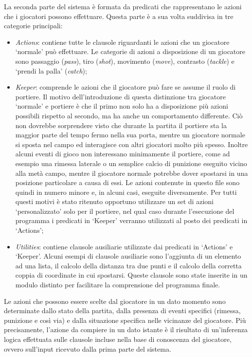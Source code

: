 La seconda parte del sistema \`{e} formata da predicati che rappresentano le azioni che i giocatori possono effettuare. Questa parte \`{e} a sua volta suddivisa in tre categorie principali:
\begin{itemize}
\item \emph{Actions}: contiene tutte le clausole riguardanti le azioni che un giocatore `normale' pu\`{o} effettuare. Le categorie di azioni a disposizione di un giocatore sono passaggio (\emph{pass}), tiro (\emph{shot}), movimento (\emph{move}), contrasto (\emph{tackle}) e `prendi la palla' (\emph{catch}); 
\item \emph{Keeper}: comprende le azioni che il giocatore pu\`{o} fare se assume il ruolo di portiere. Il motivo dell'introduzione di questa distinzione tra giocatore `normale' e portiere \`{e}  che il primo non solo ha a disposizione pi\`{u}  azioni possibili rispetto al secondo, ma ha anche un comportamento differente. Ci\`{o}  non dovrebbe sorprendere visto che durante la partita il portiere sta la maggior parte del tempo fermo nella sua porta, mentre un giocatore normale si sposta nel campo ed interagisce con altri giocatori molto pi\`{u}  spesso. Inoltre alcuni eventi di gioco non interessano minimamente il portiere, come ad esempio una rimessa laterale o un semplice calcio di punizione eseguito vicino alla met\`{a}  campo, mentre il giocatore normale potrebbe dover spostarsi in una posizione particolare a causa di essi. Le azioni contenute in questo file sono quindi in numero minore e, in alcuni casi, eseguite diversamente. Per tutti questi motivi \`{e}  stato ritenuto opportuno utilizzare un set di azioni `personalizzato' solo per il portiere, nel qual caso durante l'esecuzione del programma i predicati in `Keeper' verranno utilizzati al posto dei predicati in `Actions';
\item \emph{Utilities}: contiene clausole ausiliarie utilizzate dai predicati in `Actions' e `Keeper'. Alcuni esempi di clausole ausiliarie sono l'aggiunta di un elemento ad una lista, il calcolo della distanza tra due punti e il calcolo della corretta coppia di coordinate in cui spostarsi. Queste clausole sono state inserite in un modulo distinto per facilitare la comprensione del programma finale.
\end{itemize}
\noindent Le azioni che possono essere scelte dal giocatore in un dato momento sono determinate dallo stato della partita, dalla presenza di eventi specifici (rimessa, punizione e così via) e dalla situazione specifica nelle vicinanze del giocatore. Pi\`{u} precisamente, l'azione da compiere in un dato istante \`{e} il risultato di un'inferenza logica effettuata sulle clausole incluse nella base di conoscenza del giocatore, ovvero sull'input ricevuto dalla prima parte del sistema.

